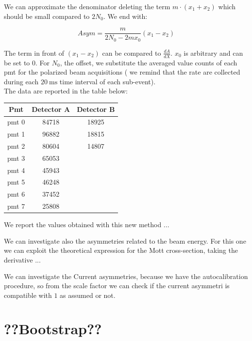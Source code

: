 We can approximate the denominator deleting the term $ m \cdot (x_{1} +  x_{2})$ which should be small compared to $2N_{0}$. We end with:

\begin{equation}
Asym = \dfrac{m}{2N_{0} - 2mx_{0}}(x_{1} -  x_{2})
\end{equation}

The term in front of $(x_{1} - x_{2})$ can be compared to $\frac{dA}{dX}$. $x_{0}$ is arbitrary and can be set to 0. For $N_{0}$, the offset, we substitute the averaged value counts of each pmt for the polarized beam acquisitions ( we remind that the rate are collected during each $\SI{20}{\milli \second}$ time interval of each sub-event).\\
The data are reported in the table below:

\begin{center}
\begin{tabular}{|c|c|c|}
\hline 
Pmt & Detector A & Detector B \\ 
\hline 
pmt 0 & 84718 & 18925 \\ 
\hline 
pmt 1 & 96882 & 18815 \\ 
\hline 
pmt 2 & 80604 & 14807 \\ 
\hline 
pmt 3 & 65053 & \\ 
\hline 
pmt 4 & 45943 & \\ 
\hline 
pmt 5 & 46248 & \\ 
\hline 
pmt 6 & 37452 & \\ 
\hline 
pmt 7 & 25808 & \\ 
\hline 
\end{tabular} 
\end{center}
 
We report the values obtained with this new method ... 


We can investigate also the asymmetries related to the beam energy. For this one we can exploit the theoretical expression for the Mott cross-section, taking the derivative ...

We can investigate the Current asymmetries, because we have the autocalibration procedure, so from the scale factor we can check if the current asymmetri is compatible with $1$ as assumed or not.
\section{??Bootstrap??}





